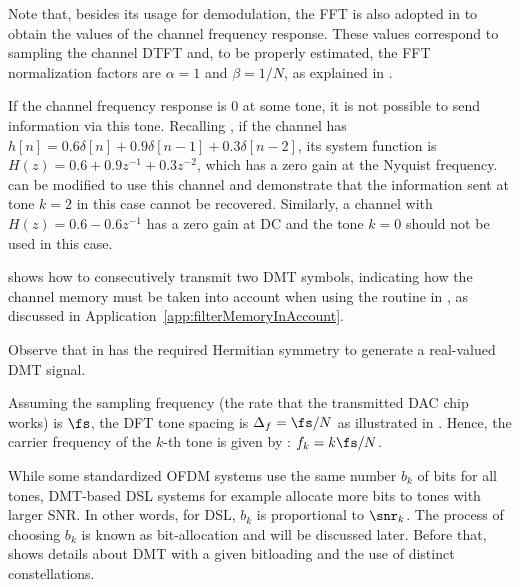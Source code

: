 Note that, besides its usage for demodulation, the FFT is also adopted in  to obtain the values  of the channel frequency response. These values correspond to sampling the channel DTFT and, to be properly estimated, the FFT normalization factors are $\alpha=1$ and $\beta=1/N$, as explained in .

If the channel frequency response is 0 at some tone, it is not possible to send information via this tone. Recalling , if the channel has $h[n]=0.6 \delta[n] + 0.9 \delta[n-1] + 0.3 \delta[n-2]$, its system function is $H(z)=0.6 + 0.9 z^{-1} + 0.3 z^{-2}$, which has a zero gain at the Nyquist frequency.  can be modified to use this channel and demonstrate that the information sent at tone $k=2$ in this case cannot be recovered. Similarly, a channel with $H(z)=0.6 - 0.6 z^{-1}$ has a zero gain at DC and the tone $k=0$ should not be used in this case.

 shows how to consecutively transmit two DMT symbols, indicating how the channel memory must be taken into account when using the routine  in {\matlab}, as discussed in Application~\ref{app:filterMemoryInAccount}.



Observe that  in  has the required Hermitian symmetry to generate a real-valued DMT signal.

Assuming the sampling frequency (the rate that the transmitted DAC chip works) is $\fs$, the DFT tone spacing is $\Delta_f = \fs/N$ as illustrated in . Hence, the carrier frequency of the $k$-th tone is given by : $f_k  = k \fs/N$.

While some standardized OFDM systems use the same number $b_k$ of bits for all tones, DMT-based DSL systems for example allocate more bits to tones with larger SNR. In other words, for DSL, $b_k$ is proportional to $\snr_k$. The process of choosing $b_k$ is known as bit-allocation and will be discussed later. Before that, 
 shows details about DMT with a given bitloading and the use of distinct constellations.

